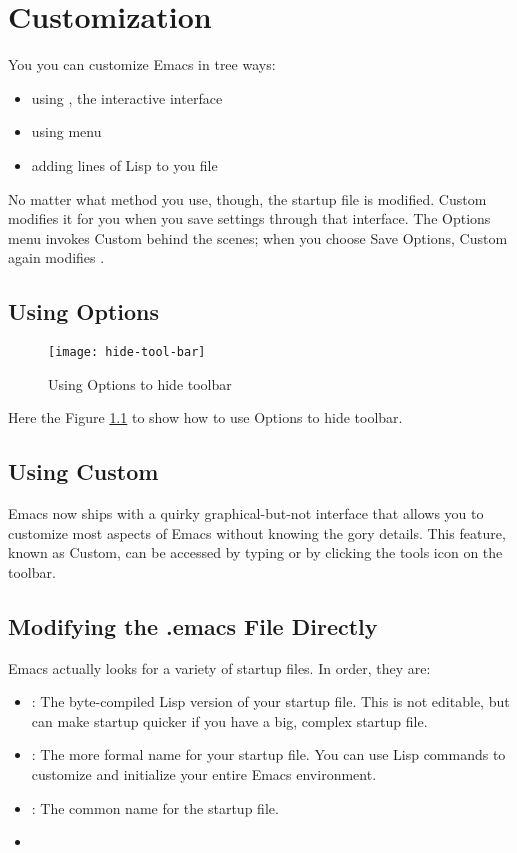 
\chapter{Customization}
\label{cha:customization}

You you can customize Emacs in tree ways:
\begin{itemize}
\item using , the interactive interface
\item using  menu
\item adding lines of Lisp to you  file
\end{itemize}


No matter what method you use, though, the  startup file is modified.
Custom modifies it for you when you save settings through that interface.
The Options menu invokes Custom behind the scenes; when you choose Save Options, Custom again modifies . 

\section{Using Options}
\label{sec:using-options}



\begin{figure}[!htp]
  \centering
  \texttt{[image: hide-tool-bar]}
  \caption{Using Options to hide toolbar}
  \label{fig:hide-tool-bar}
\end{figure}

Here the Figure \ref{fig:hide-tool-bar} to show how to use Options to hide toolbar.

\section{Using Custom}
\label{sec:using-custom}

Emacs now ships with a quirky graphical-but-not interface that allows you to customize most aspects of Emacs without knowing the gory details.
This feature, known as Custom, can be accessed by typing  or by clicking the tools icon on the toolbar.

\section{Modifying the .emacs File Directly}
\label{sec:modify-.emacs-file}

Emacs actually looks for a variety of startup files. In order, they are:
\begin{itemize}
\item {}: The byte-compiled Lisp version of your startup file. This is not editable, but can make startup quicker if you have a big, complex startup file.
\item {}: The more formal name for your startup file. You can use Lisp commands to customize and initialize your entire Emacs environment.
\item {}: The common name for the startup file. 
\item {}
\end{itemize}

